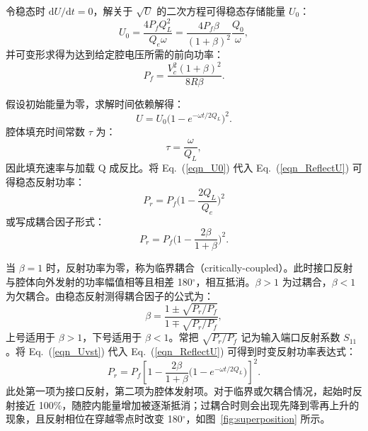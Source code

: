 \documentclass{cernyrep}
\begin{document}
令稳态时 $\mathrm{d}U/\mathrm{d}t=0$，解关于 $\sqrt{U}$ 的二次方程可得稳态存储能量 $U_0$：
\begin{equation}
\label{eqn_U0}
U_0 =  \frac{4 P_f Q_L^2}{Q_e \omega}= \frac{4 P_f \beta}{(1+\beta)^2} \frac{Q_0}{\omega},
\end{equation}
并可变形求得为达到给定腔电压所需的前向功率：
\begin{equation}
\label{eqn_Pf}
P_f =  \frac{V_c^2 (1+\beta)^2}{8 R \beta}.
\end{equation}

假设初始能量为零，求解时间依赖解得：
\begin{equation}
\label{eqn_Uvst}
U = U_0  \bigg( 1 - e^{-\omega t/2 Q_L} \bigg)^2.
\end{equation}
腔体填充时间常数 $\tau$ 为：
\begin{equation}
\tau=\frac{\omega}{Q_L},
\end{equation}
因此填充速率与加载 Q 成反比。将 Eq.~(\ref{eqn_U0}) 代入 Eq.~(\ref{eqn_ReflectU}) 可得稳态反射功率：
\begin{equation}
P_r= P_f \Bigg( 1- \frac{2 Q_L}{Q_e} \Bigg)^2
\end{equation}
或写成耦合因子形式：
\begin{equation}
P_r= P_f \Bigg( 1- \frac{2 \beta}{1+ \beta} \Bigg)^2.
\end{equation}

当 $\beta=1$ 时，反射功率为零，称为临界耦合（critically-coupled）。此时接口反射与腔体向外发射的功率幅值相等且相差 180$^\circ$，相互抵消。$\beta>1$ 为过耦合，$\beta<1$ 为欠耦合。由稳态反射测得耦合因子的公式为：
\begin{equation}
\beta= \frac{1 \pm \sqrt{P_r/P_f}}{1 \mp \sqrt{P_r/P_f}},
\end{equation}
上号适用于 $\beta>1$，下号适用于 $\beta<1$。常把 $\sqrt{P_r/P_f}$ 记为输入端口反射系数 $S_{11}$。将 Eq.~(\ref{eqn_Uvst}) 代入 Eq.~(\ref{eqn_ReflectU}) 可得到时变反射功率表达式：
\begin{equation}
P_r= P_f \left[ 1- \frac{2 \beta}{1+ \beta} \bigg( 1 - e^{-\omega t/2 Q_L} \bigg) \right]^2.
\end{equation}
此处第一项为接口反射，第二项为腔体发射项。对于临界或欠耦合情况，起始时反射接近 100\%，随腔内能量增加被逐渐抵消；过耦合时则会出现先降到零再上升的现象，且反射相位在穿越零点时改变 180$^\circ$，如图~\ref{fig:superposition} 所示。
\end{document}

